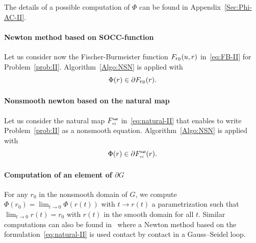 The details of a possible computation of $\Phi$ can be found in Appendix~\ref{Sec:Phi-AC-II}.

\paragraph{Newton method based on  SOCC-function}
\label{Sec:Num-SOCCP}
Let us consider now the Fischer-Burmeister function $F_{{\hbox{\tiny{\textsf FB}}}}(u,r)$ in~\eqref{eq:FB-II} for Problem~\ref{prob:II}.
Algorithm~\ref{Algo:NSN} is applied {with}
\begin{equation}  \label{eq:phiphi-soccp}
    \Phi(r) \in \partial F_{\fb}(r).
\end{equation}

\paragraph{Nonsmooth newton based on the natural map }
Let us consider the natural map $F_{{\hbox{\tiny{vi}}}}^{\hbox{\sf \tiny{nat}}}$ in~\eqref{eq:natural-II} that enables to write Problem~\ref{prob:II} {as} a nonsmooth equation.
Algorithm~\ref{Algo:NSN} is applied {with}
\begin{equation}  \label{eq:phiphi}
    \Phi(r) \in \partial F_{\vitwo}^\nat(r).
\end{equation}
\fi

\paragraph{Computation of an element of $\partial G$}

For any $r_0$ in the nonsmooth domain of $G$, we compute $\Phi(r_0) = \lim_{t\to0}\Phi(r(t))$ with $t \to r(t)$ a parametrization such that $\lim_{t\to0}r(t) = r_0$ with $r(t)$ in the smooth domain for all $t$.
Similar computations can also be found in~\cite{Joli.Feng2008} where a Newton method based on the formulation~\eqref{eq:natural-II} is used contact by contact in a Gauss--Seidel loop.

